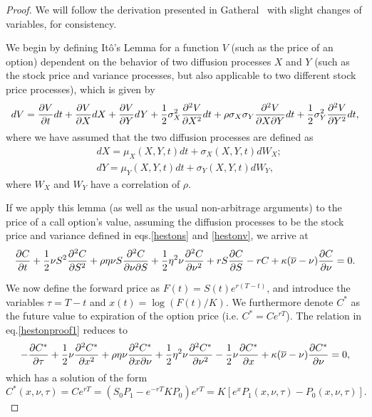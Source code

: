 \begin{proof}
We will follow the derivation presented in Gatheral~\citep{gatheral} with slight changes of variables, for consistency.

We begin by defining Itô's Lemma for a function $V$ (such as the price of an option) dependent on the behavior of two diffusion processes $X$ and $Y$ (such as the stock price and variance processes, but also applicable to two different stock price processes), which is given by
\begin{equation}
dV=\pdv{V}{t}dt+\pdv{V}{X}dX+\pdv{V}{Y}dY+\frac{1}{2}\sigma_X^2\pdv[2]{V}{X}dt+\rho\sigma_X\sigma_Y\pdv{V}{X}{Y}dt+\frac{1}{2}\sigma_Y^2\pdv[2]{V}{Y}dt,
\end{equation}
\noindent where we have assumed that the two diffusion processes are defined as
\begin{equation}
\begin{split}
&dX=\mu_X(X,Y,t)dt+\sigma_X(X,Y,t)dW_X;\\
&dY=\mu_Y(X,Y,t)dt+\sigma_Y(X,Y,t)dW_Y,
\end{split}
\end{equation}
\noindent where $W_X$ and $W_Y$ have a correlation of $\rho$.

If we apply this lemma (as well as the usual non-arbitrage arguments) to the price of a call option's value, assuming the diffusion processes to be the stock price and variance defined in eqs.\eqref{hestons} and \eqref{hestonv}, we arrive at
\begin{equation}\label{hestonproof1}
\pdv{C}{t}+\frac{1}{2}\nu S^2\pdv[2]{C}{S}+\rho\eta\nu S\pdv{C}{\nu}{S}+\frac{1}{2}\eta^2\nu\pdv[2]{C}{\nu}+rS\pdv{C}{S}-rC+\kappa(\overline{\nu}-\nu)\pdv{C}{\nu}=0.
\end{equation}

We now define the forward price as $F(t)=S(t)e^{r(T-t)}$, and introduce the variables $\tau=T-t$ and $x(t)=\log\left(F(t)/K\right)$. We furthermore denote $C^*$ as the future value to expiration of the option price (i.e. $C^*=Ce^{rT}$). The relation in eq.\eqref{hestonproof1} reduces to
\begin{equation}\label{hestonproof2}
-\pdv{C^*}{\tau}+\frac{1}{2}\nu\pdv[2]{C^*}{x}+\rho\eta\nu\pdv{C^*}{x}{\nu}+\frac{1}{2}\eta^2\nu\pdv[2]{C^*}{\nu}-\frac{1}{2}\nu\pdv{C^*}{x}+\kappa(\overline{\nu}-\nu)\pdv{C^*}{\nu}=0,
\end{equation}
\noindent which has a solution of the form ~\citep{duffie}
\begin{equation}\label{hestonproof3}
C^*(x,\nu,\tau)=Ce^{rT}=\left(S_0P_1-e^{-rT}KP_0\right)e^{rT}=K\left[e^xP_1(x,\nu,\tau)-P_0(x,\nu,\tau)\right].
\end{equation}



\end{proof}
